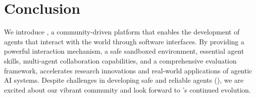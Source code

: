 \section{Conclusion}

We introduce \projname, a community-driven platform that enables the development of agents that interact with the world through software interfaces.
By providing a powerful interaction mechanism, a safe sandboxed environment, essential agent skills, multi-agent collaboration capabilities, and a comprehensive evaluation framework, \projname accelerates research innovations and real-world applications of agentic AI systems.
Despite challenges in developing safe and reliable agents (), we are excited about our vibrant community and look forward to \projname's continued evolution.

